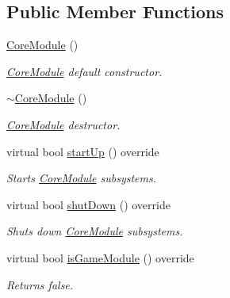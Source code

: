 \subsection*{Public Member Functions}
\begin{DoxyCompactItemize}
\item 
\mbox{\label{class_arcana_1_1_core_module_a89b8e48937c965b18271089977a085b3}} 
\mbox{\hyperlink{class_arcana_1_1_core_module_a89b8e48937c965b18271089977a085b3}{Core\+Module}} ()
\begin{DoxyCompactList}\small\item\em \mbox{\hyperlink{class_arcana_1_1_core_module}{Core\+Module}} default constructor. \end{DoxyCompactList}\item 
\mbox{\label{class_arcana_1_1_core_module_ad4d003080f3890cf3453ce1cd30e2e1c}} 
\mbox{\hyperlink{class_arcana_1_1_core_module_ad4d003080f3890cf3453ce1cd30e2e1c}{$\sim$\+Core\+Module}} ()
\begin{DoxyCompactList}\small\item\em \mbox{\hyperlink{class_arcana_1_1_core_module}{Core\+Module}} destructor. \end{DoxyCompactList}\item 
\mbox{\label{class_arcana_1_1_core_module_afe11bce906ee84a565855892a679feed}} 
virtual bool \mbox{\hyperlink{class_arcana_1_1_core_module_afe11bce906ee84a565855892a679feed}{start\+Up}} () override
\begin{DoxyCompactList}\small\item\em Starts \mbox{\hyperlink{class_arcana_1_1_core_module}{Core\+Module}} subsystems. \end{DoxyCompactList}\item 
\mbox{\label{class_arcana_1_1_core_module_a2d95a9e6a9ce9c985d3de614d71edfff}} 
virtual bool \mbox{\hyperlink{class_arcana_1_1_core_module_a2d95a9e6a9ce9c985d3de614d71edfff}{shut\+Down}} () override
\begin{DoxyCompactList}\small\item\em Shuts down \mbox{\hyperlink{class_arcana_1_1_core_module}{Core\+Module}} subsystems. \end{DoxyCompactList}\item 
virtual bool \mbox{\hyperlink{class_arcana_1_1_core_module_a0b16024de66b0b0f50bac83f20d50c74}{is\+Game\+Module}} () override
\begin{DoxyCompactList}\small\item\em Returns false. \end{DoxyCompactList}\end{DoxyCompactItemize}


